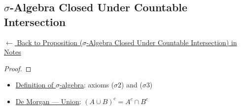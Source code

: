 
\subsection*{$\sigma$-Algebra Closed Under Countable Intersection}
\label{prf:sigma-closed-countable-intersection}

\begin{remark*}[Return]
\hyperref[prop:sigma-closed-countable-intersection]{$\leftarrow$ Back to Proposition ($\sigma$-Algebra Closed Under Countable Intersection) in Notes}
\end{remark*}

\begin{proof}
\end{proof}

\begin{remark*}

\end{remark*}

\begin{remark*}[Dependencies]
\begin{itemize}
  \item \hyperref[def:sigma-algebra]{Definition of $\sigma$-algebra}: axioms ($\sigma$2) and ($\sigma$3)
  \item \hyperref[prop:demorgan-cup]{De Morgan --- Union}: $(A\cup B)^c = A^c\cap B^c$
\end{itemize}

\end{remark*}
